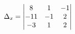 \documentclass[preview]{standalone}
\begin{document}
\begin{align*}
\special{dvisvgm:raw <g id='unique000'>}\Delta_x = \begin{vmatrix} 8 & 1 & -1 \\ -11 & -1 & 2 \\ -3 & 1 & 2 \end{vmatrix}\special{dvisvgm:raw </g>}
\end{align*}
\end{document}
